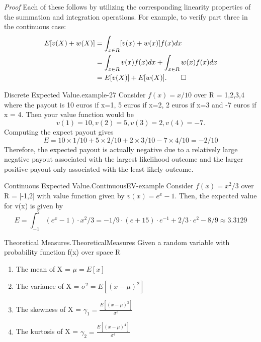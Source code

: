 \documentclass[10pt,]{book}
\makeatletter
\renewcommand*{\proofname}{Proof}
\renewenvironment{proof}[1][\proofname]{\par
  \pushQED{\qed}%
  \normalfont \topsep6\p@\@plus6\p@\relax
  \trivlist
  \item\relax
    {\itshape
    #1\@addpunct{.}}\hspace\labelsep\ignorespaces
}{%
  \popQED\endtrivlist\@endpefalse
}
\numberwithin{equation}{section}
\makeatother
\begin{document}
\begin{proof}\hypertarget{proof-31}{}
\hypertarget{p-723}{}%
Each of these follows by utilizing the corresponding linearity properties of the summation and integration operations. For example, to verify part three in the continuous case:%
\begin{align*}
E[v(X) + w(X)] & = \int_{x \in R} [v(x)+w(x)]f(x) dx\\
& = \int_{x \in R} v(x)f(x) dx + \int_{x \in R} w(x)f(x) dx\\
& = E[v(X)] + E[w(X)].\qedhere
\end{align*}
%
\end{proof}
%
\par
\hypertarget{p-724}{}%
\begin{example}{Discrete Expected Value.}{example-27}%
\hypertarget{p-725}{}%
Consider \(f(x) = x/10\) over R = {1,2,3,4} where the payout is 10 euros if x=1, 5 euros if x=2, 2 euros if x=3 and -7 euros if x = 4.  Then your value function would be%
\begin{equation*}
v(1)=10, v(2) = 5, v(3)=2, v(4) = -7.
\end{equation*}
Computing the expect payout gives%
\begin{equation*}
E = 10 \times 1/10 + 5 \times 2/10 + 2 \times 3/10 - 7 \times 4/10 = -2/10
\end{equation*}
Therefore, the expected payout is actually negative due to a relatively large negative payout associated with the largest likelihood outcome and the larger positive payout only associated with the least likely outcome.%
\end{example}
%
\par
\hypertarget{p-726}{}%
\begin{example}{Continuous Expected Value.}{ContinuousEV-example}%
\hypertarget{p-727}{}%
Consider \(f(x) = x^2/3\) over R = [-1,2] with value function given by \(v(x) = e^x - 1\). Then, the expected value for v(x) is given by%
\begin{equation*}
E = \int_{-1}^2 (e^x-1) \cdot x^2/3 = -1/9 \cdot (e + 15) \cdot e^{-1} + 2/3 \cdot e^2 - 8/9 \approx 3.3129
\end{equation*}
%
\end{example}
%
\par
\hypertarget{p-728}{}%
\begin{definition}{Theoretical Measures.}{TheoreticalMeasures}%
\hypertarget{p-729}{}%
Given a random variable with probability function f(x) over space R \leavevmode%
\begin{enumerate}
\item\hypertarget{li-194}{}The mean of X = \(\mu = E[x]\)%
\item\hypertarget{li-195}{}The variance of X = \(\sigma^2 = E[(x-\mu)^2]\)%
\item\hypertarget{li-196}{}The skewness of X = \(\gamma_1 = \frac{E[(x-\mu)^3]}{\sigma^3}\)%
\item\hypertarget{li-197}{}The kurtosis of X = \(\gamma_2 = \frac{E[(x-\mu)^4]}{\sigma^4}\)%
\end{enumerate}
%
\end{definition}
\end{document}
